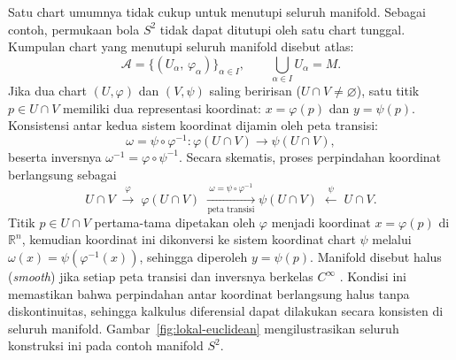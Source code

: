 Satu chart umumnya tidak cukup untuk menutupi seluruh manifold. Sebagai contoh, permukaan bola $S^2$ tidak dapat ditutupi oleh satu chart tunggal. Kumpulan chart yang menutupi seluruh manifold disebut atlas:
\begin{equation}
    \mathcal{A} = \{(U_\alpha,\, \varphi_\alpha)\}_{\alpha \in I}, \qquad \bigcup_{\alpha \in I} U_\alpha = M.
\end{equation}
Jika dua chart $(U, \varphi)$ dan $(V, \psi)$ saling beririsan ($U \cap V \neq \varnothing$), satu titik $p \in U \cap V$ memiliki dua representasi koordinat: $x = \varphi(p)$ dan $y = \psi(p)$. Konsistensi antar kedua sistem koordinat dijamin oleh peta transisi:
\begin{equation}\label{eq:transition-map}
    \omega = \psi \circ \varphi^{-1} : \varphi(U \cap V) \longrightarrow \psi(U \cap V),
\end{equation}
beserta inversnya $\omega^{-1} = \varphi \circ \psi^{-1}$. Secara skematis, proses perpindahan koordinat berlangsung sebagai
\begin{equation}
    U\cap V 
    \;\xrightarrow{\;\varphi\;}\; 
    \varphi(U\cap V)
    \;\xrightarrow[\text{peta transisi}]{\;\omega = \psi\circ\varphi^{-1}\;}
    \psi(U\cap V)
    \;\xleftarrow{\;\psi\;}\;
    U\cap V.
\end{equation}
Titik $p \in U \cap V$ pertama-tama dipetakan oleh $\varphi$ menjadi koordinat $x = \varphi(p)$ di $\mathbb{R}^n$, kemudian koordinat ini dikonversi ke sistem koordinat chart $\psi$ melalui $\omega(x) = \psi(\varphi^{-1}(x))$, sehingga diperoleh $y = \psi(p)$. Manifold disebut halus (\textit{smooth}) jika setiap peta transisi dan inversnya berkelas $C^\infty$ \cite{nakahara2003geometry}. Kondisi ini memastikan bahwa perpindahan antar koordinat berlangsung halus tanpa diskontinuitas, sehingga kalkulus diferensial dapat dilakukan secara konsisten di seluruh manifold. Gambar~\ref{fig:lokal-euclidean} mengilustrasikan seluruh konstruksi ini pada contoh manifold $S^2$.

